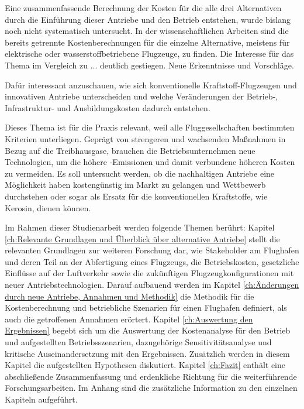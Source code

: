 Eine zusammenfassende Berechnung der Kosten für die alle drei Alternativen durch die Einführung dieser Antriebe und den Betrieb entstehen, 
wurde bislang noch nicht systematisch
untersucht. In der wissenschaftlichen Arbeiten sind die bereits getrennte Kostenberechnungen für die einzelne Alternative, meistens für 
elektrische oder wasserstoffbetriebene Flugzeuge, zu finden. Die Interesse für das Thema im Vergleich zu ... deutlich gestiegen.
Neue Erkenntnisse und Vorschläge.

Dafür interessant anzuschauen, wie sich konventionelle Kraftstoff-Flugzeugen und innovativen Antriebe unterscheiden 
und welche Veränderungen der Betrieb-, Infrastruktur- und Ausbildungskosten dadurch entstehen.

Dieses Thema ist für die Praxis relevant, weil alle Fluggesellschaften bestimmten Kriterien unterliegen. 
Geprägt von strengeren und wachsenden Maßnahmen in Bezug auf die Treibhausgase, brauchen die Betriebsunternehmen neue Technologien, um die  
höhere -Emissionen und damit verbundene höheren Kosten zu vermeiden.
Es soll untersucht werden, ob die nachhaltigen Antriebe eine Möglichkeit haben kostengünstig im Markt zu gelangen und Wettbewerb durchstehen oder 
sogar als Ersatz für die konventionellen Kraftstoffe, wie Kerosin, dienen können.

Im Rahmen dieser Studienarbeit werden folgende Themen berührt:
Kapitel \ref{ch:Relevante Grundlagen und Überblick über alternative Antriebe} stellt die relevanten Grundlagen zur weiteren Forschung dar, wie Stakeholder am Flughafen und deren Teil an der Abfertigung eines Flugzeugs,
die Betriebskosten, gesetzliche Einflüsse auf der Luftverkehr sowie die zukünftigen Flugzeugkonfigurationen mit neuer Antriebstechnologien.
Darauf aufbauend werden im Kapitel \ref{ch:Änderungen durch neue Antriebe, Annahmen und Methodik} die Methodik für die Kostenberechnung und betriebliche Szenarien für einen Flughafen definiert, 
als auch die getroffenen Annahmen erörtert.
Kapitel \ref{ch:Auswertung den Ergebnissen} begebt sich um die Auswertung der Kostenanalyse für den Betrieb und aufgestellten Betriebsszenarien, dazugehörige Sensitivitätsanalyse und
kritische Auseinandersetzung mit den Ergebnissen. Zusätzlich werden in diesem Kapitel die aufgestellten Hypothesen diskutiert.
%
Kapitel \ref{ch:Fazit} enthält eine abschließende Zusammenfassung und erdenkliche Richtung für die weiterführende Forschungsarbeiten.
Im Anhang sind die zusätzliche Information zu den einzelnen Kapiteln aufgeführt.
